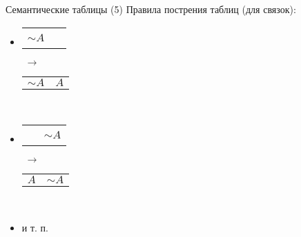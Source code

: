 \documentclass{beamer}
\begin{document}
\begin{frame}{Семантические таблицы (5)}
Правила пострения таблиц (для связок):\\
\bigskip
\begin{itemize}
  \item 
      \begin{tabular}{p{0.75cm}|p{0.75cm}}
        \hline
        $\sim \! A$ & ~ \\
      \end{tabular}
      $\; \to \;$
      \begin{tabular}{p{0.75cm}|p{0.75cm}}
        \hline
        $\sim \! A$ & $A$ \\
      \end{tabular}\\
      \bigskip
  \item 
      \begin{tabular}{p{0.75cm}|p{0.75cm}}
        \hline
        ~ & $\sim \! A$ \\
      \end{tabular}
      $\; \to \;$
      \begin{tabular}{p{0.75cm}|p{0.75cm}}
        \hline
        $A$ & $\sim \! A$ \\
      \end{tabular}\\
      \bigskip
  \item и т. п.
\end{itemize}
\end{frame}
\end{document}
